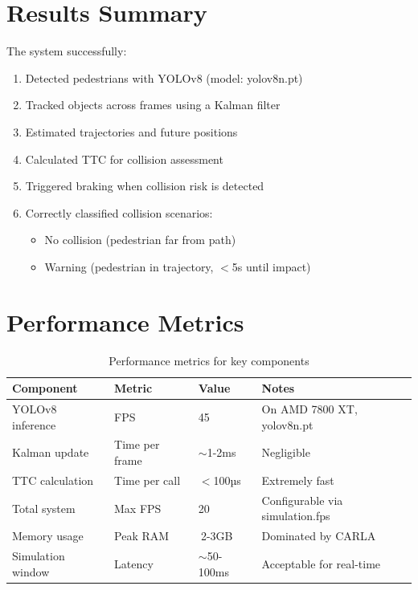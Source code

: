 \section{Results Summary}

The system successfully:

\begin{enumerate}
    \item Detected pedestrians with YOLOv8 (model: yolov8n.pt)
    \item Tracked objects across frames using a Kalman filter
    \item Estimated trajectories and future positions
    \item Calculated TTC for collision assessment
    \item Triggered braking when collision risk is detected
    
    \item Correctly classified collision scenarios:
    \begin{itemize}
        \item No collision (pedestrian far from path)
        \item Warning (pedestrian in trajectory, $<$5s until impact)
    \end{itemize}
\end{enumerate}

\section{Performance Metrics}

\begin{table}[h]
    \centering
    \begin{tabular}{|l|l|l|l|}
        \hline
        Component & Metric & Value & Notes \\
        \hline
        YOLOv8 inference & FPS & 45 & On AMD 7800 XT, yolov8n.pt \\
        \hline
        Kalman update & Time per frame & $\sim$1-2ms & Negligible \\
        \hline
        TTC calculation & Time per call & $<$100µs & Extremely fast \\
        \hline
        Total system & Max FPS & 20 & Configurable via simulation.fps \\
        \hline
        Memory usage & Peak RAM & $~$2-3GB & Dominated by CARLA \\
        \hline
        Simulation window & Latency & $\sim$50-100ms & Acceptable for real-time \\
        \hline
    \end{tabular}
    \caption{Performance metrics for key components}
\end{table}


